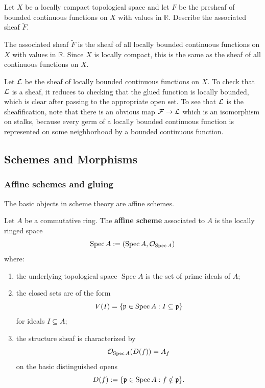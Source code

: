\documentclass[12pt]{article}
\begin{document}
\begin{exercise}
    Let $X$ be a locally compact topological space and let $F$ be the presheaf
    of bounded continuous functions on $X$ with values in $\mathbb{R}$. Describe the
    associated sheaf $\widetilde{F}$.
\end{exercise}

\begin{solution}
    The associated sheaf $\widetilde{F}$ is the sheaf of all locally bounded continuous functions on $X$ with values in $\mathbb{R}$. Since $X$ is locally compact, this is the same as the sheaf of all continuous functions on $X$.

    Let ${\mathcal{L}}$ be the sheaf of locally bounded continuous functions on $X$. To check that ${\mathcal{L}}$ is a sheaf, it reduces to checking that the glued function is locally bounded, which is clear after passing to the appropriate open set.
    To see that ${\mathcal{L}}$ is the sheafification, note that there is an obvious map ${\mathcal{F}} \to {\mathcal{L}}$ which is an isomorphism on stalks, because every germ of a locally bounded continuous function is represented on some neighborhood by a bounded continuous function.
\end{solution}

\subsection{Schemes and Morphisms}

\subsubsection{Affine schemes and gluing}

The basic objects in scheme theory are affine schemes.

\begin{definition}
    Let $A$ be a commutative ring. The \textbf{affine scheme} associated to $A$ is the locally ringed space
    \[
        \operatorname{Spec} A := (\operatorname{Spec}A, \mathcal O_{\operatorname{Spec} A})
    \]
    where:
    \begin{enumerate}
        \item the underlying topological space $\operatorname{Spec}A$ is the set of prime ideals of $A$;
        \item the closed sets are of the form
              \[
                  V(I)=\{\mathfrak p\in \operatorname{Spec} A : I\subseteq \mathfrak p\}
              \]
              for ideals $I\subseteq A$;
        \item the structure sheaf is characterized by
              \[
                  \mathcal O_{\operatorname{Spec} A}(D(f)) = A_f
              \]
              on the basic distinguished opens
              \[
                  D(f):=\{\mathfrak p\in \operatorname{Spec} A : f\notin \mathfrak p\}.
              \]
    \end{enumerate}
\end{definition}
\end{document}
